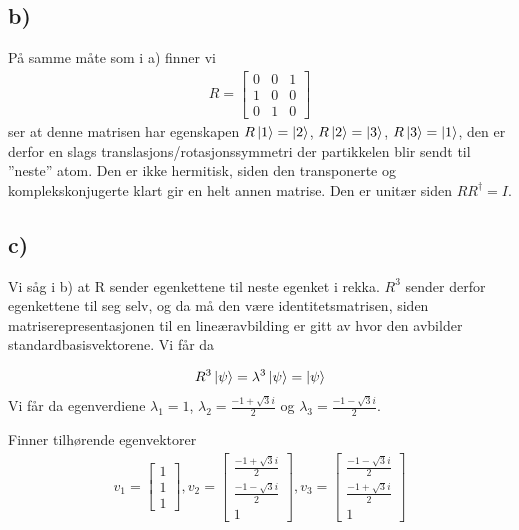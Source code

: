 \documentclass[norsk,a4paper,12pt]{article}
\begin{document}
	\subsection*{b)}
	På samme måte som i a) finner vi
	\begin{equation}
	\begin{aligned}
	R = \left[ \begin{matrix} 0 & 0 & 1 \\ 1 & 0 & 0 \\ 0 & 1 & 0 \end{matrix} \right]
	\end{aligned}
	\end{equation}
	ser at denne matrisen har egenskapen $R\ket{1} = \ket{2}$, $R\ket{2} = \ket{3}$, $R\ket{3} = \ket{1}$, den er derfor en slags translasjons/rotasjonssymmetri der partikkelen blir sendt til ''neste'' atom. Den er ikke hermitisk, siden den transponerte og komplekskonjugerte klart gir en helt annen matrise. Den er unitær siden $R R^\dagger = I$.
	
	\subsection*{c)}
	Vi såg i b) at R sender egenkettene til neste egenket i rekka. $R^3$ sender derfor egenkettene til seg selv, og da må den være identitetsmatrisen, siden matriserepresentasjonen til en lineæravbilding er gitt av hvor den avbilder standardbasisvektorene. Vi får da
	
	\begin{equation}
	\begin{aligned}
	R^3 \ket{\psi} = \lambda^3 \ket{\psi} = \ket{\psi}
	\end{aligned}
	\end{equation}
	Vi får da egenverdiene $\lambda_1 = 1$, $\lambda_2 = \frac{-1 + \sqrt{3}i}{2}$ og $\lambda_3 = \frac{-1 - \sqrt{3}i}{2}$.
	
	Finner tilhørende egenvektorer
	\begin{equation}
	\begin{aligned}
	v_1 = \left[ \begin{matrix} 1 \\ 1 \\ 1 \end{matrix} \right], 
	v_2 = \left[ \begin{matrix} \frac{-1 + \sqrt{3}i}{2} \\ \frac{-1 - \sqrt{3}i}{2} \\ 1 \end{matrix} \right], 
	v_3 = \left[ \begin{matrix} \frac{-1 - \sqrt{3}i}{2} \\ \frac{-1 + \sqrt{3}i}{2} \\ 1 \end{matrix} \right]
	\end{aligned}
	\end{equation}
	
\end{document}
